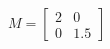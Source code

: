 \documentclass[preview]{standalone}
\begin{document}
\begin{align*}
M = \begin{bmatrix} 2 & 0 \\ 0 & 1.5 \end{bmatrix}
\end{align*}
\end{document}
